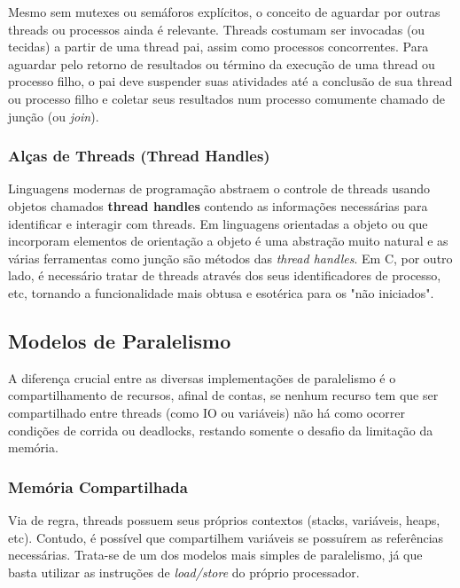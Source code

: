 \documentclass{article}
\begin{document}
Mesmo sem mutexes ou semáforos explícitos, o conceito de aguardar por outras threads ou processos ainda é relevante. Threads costumam ser invocadas (ou tecidas) a partir de uma thread pai, assim como processos concorrentes. Para aguardar pelo retorno de resultados ou término da execução de uma thread ou processo filho, o pai deve suspender suas atividades até a conclusão de sua thread ou processo filho e coletar seus resultados num processo comumente chamado de junção (ou \emph{join}).

\subsubsection{Alças de Threads (Thread Handles)}
\label{sssec:thread handles}

Linguagens modernas de programação abstraem o controle de threads usando objetos chamados \textbf{thread handles} contendo as informações necessárias para identificar e interagir com threads. Em linguagens orientadas a objeto ou que incorporam elementos de orientação a objeto é uma abstração muito natural e as várias ferramentas como junção são métodos das \emph{thread handles}. Em C, por outro lado, é necessário tratar de threads através dos seus identificadores de processo, etc, tornando a funcionalidade mais obtusa e esotérica para os "não iniciados".

\subsection{Modelos de Paralelismo}
\label{ssec:modelos paralelismo}

A diferença crucial entre as diversas implementações de paralelismo é o compartilhamento de recursos, afinal de contas, se nenhum recurso tem que ser compartilhado entre threads (como IO ou variáveis) não há como ocorrer condições de corrida ou deadlocks, restando somente o desafio da limitação da memória.

\subsubsection{Memória Compartilhada}
\label{sssec:memoria compartilhada}

Via de regra, threads possuem seus próprios contextos (stacks, variáveis, heaps, etc). Contudo, é possível que compartilhem variáveis se possuírem as referências necessárias. Trata-se de um dos modelos mais simples de paralelismo, já que basta utilizar as instruções de \emph{load/store} do próprio processador.
\end{document}
